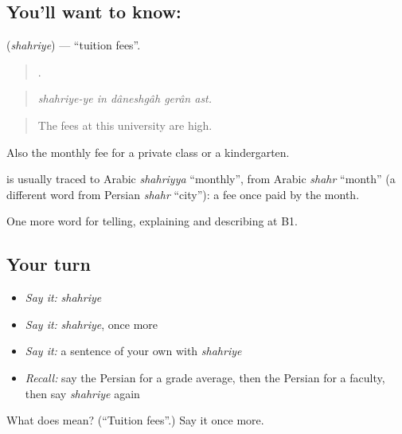 \subsection*{You'll want to know: }
\textbf{} (\emph{shahriye}) — \textquotedblleft{}tuition fees\textquotedblright{}.

\begin{quote}
    .
\end{quote}

\begin{quote}
\emph{shahriye-ye in dâneshgâh gerân ast.}
\end{quote}

\begin{quote}
The fees at this university are high.
\end{quote}

Also the monthly fee for a private class or a kindergarten.

\begin{cousinweb}
\textbf{} is usually traced to Arabic \emph{shahriyya} \textquotedblleft{}monthly\textquotedblright{}, from Arabic \emph{shahr} \textquotedblleft{}month\textquotedblright{} (a different word from Persian \emph{shahr} \textquotedblleft{}city\textquotedblright{}): a fee once paid by the month.
\end{cousinweb}

\begin{grammarlens}[title={What you've built}]
One more word for telling, explaining and describing at B1.
\end{grammarlens}

\subsection*{Your turn}
\begin{itemize}
\raggedright
  \item \emph{Say it:} \emph{shahriye}
  \item \emph{Say it:} \emph{shahriye}, once more
  \item \emph{Say it:} a sentence of your own with \emph{shahriye}
  \item \emph{Recall:} say the Persian for a grade average, then the Persian for a faculty, then say \emph{shahriye} again
\end{itemize}

\begin{tcolorbox}[breakable,colback=teal!4,colframe=teal!35!black,title={Before you move on}]
What does  mean? (\textquotedblleft{}Tuition fees\textquotedblright{}.) Say it once more.
\end{tcolorbox}
